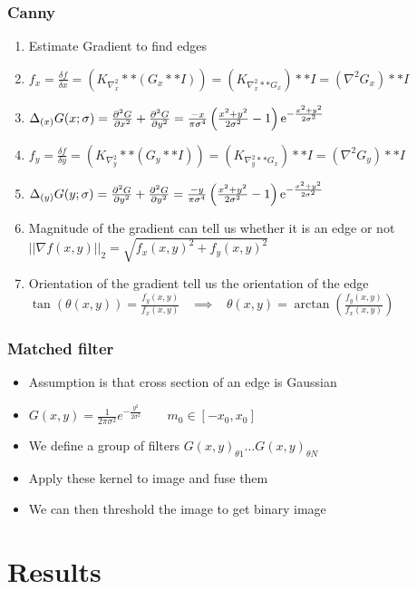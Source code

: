 \documentclass[11pt]{beamer}
\begin{document}
\begin{frame}
\frametitle{Canny}
	\begin{enumerate}
		\item Estimate Gradient to find edges
		\item $f_x=\frac{\delta f}{\delta x}=(K_{\nabla_x^2}**(G_x **I)) = (K_{\nabla_x^2**G_x})**I = (\nabla^2 G_x)**I$ 
		\item $
\Delta_{(x)}G(x;\sigma)
=
\frac{\partial^2 G}{\partial x^2} + \frac{\partial^2 G}{\partial y^2}
=
\frac{-x}{\pi\sigma^4} \left(\frac{x^2+y^2}{2\sigma^2}-1\right){\rm e}^{-\frac{x^2+y^2}{2\sigma^2}} $
		\item $f_y=\frac{\delta f}{\delta y}=(K_{\nabla_y^2}**(G_y **I)) = (K_{\nabla_y^2**G_x})**I = (\nabla^2 G_y)**I$ 
		\item $
\Delta_{(y)}G(y;\sigma)
=
\frac{\partial^2 G}{\partial y^2} + \frac{\partial^2 G}{\partial y^2}
=
\frac{-y}{\pi\sigma^4} \left(\frac{x^2+y^2}{2\sigma^2}-1\right){\rm e}^{-\frac{x^2+y^2}{2\sigma^2}} $
		\item Magnitude of the gradient can tell us whether it is an edge or not $||\nabla f(x,y) ||_2 = \sqrt{f_x(x,y)^2 + f_y(x,y)^2}$
		\item Orientation of the gradient tell us the orientation of the edge $\tan(\theta(x,y)) = \frac{f_y(x,y)}{f_x(x,y)}
\;\;\;
\implies
\;\;\;
\theta(x,y) = \arctan\left( \frac{f_y(x,y)}{f_x(x,y)} \right)$
	\end{enumerate}
\end{frame}


\begin{frame}
\frametitle{Matched filter}
\begin{itemize}
	\item Assumption is that cross section of an edge is Gaussian
	\item $G(x,y) = \frac{1}{2 \pi \sigma ^{2}} e^{- \frac{y^{2}}{2 \sigma ^{2}}} \quad\quad m_0 \in [-x_0, x_0]$
	\item We define a group of filters ${G(x, y)_{\theta1} \dots G(x, y)_{\theta N}}$
	\item Apply these kernel to image and fuse them
	\item We can then threshold the image to get binary image
\end{itemize}
\end{frame}

\section{Results}
\end{document}
